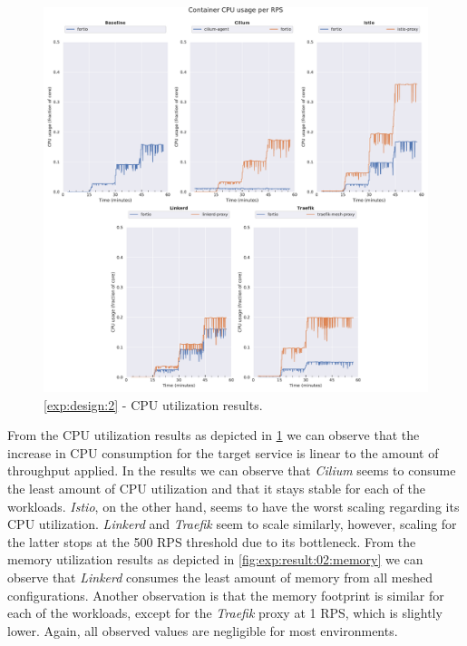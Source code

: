 \begin{figure}[h]
    \centering
    
    \includegraphics[width=\linewidth]{5_experimental_evaluation/figures/exp_02-cpu-results.pdf}

    \caption{\ref{exp:design:2} - CPU utilization results.}
    
    \label{fig:exp:result:02:cpu}
\end{figure}


From the CPU utilization results as depicted in \cref{fig:exp:result:02:cpu} we can observe that the increase in CPU consumption for the target service is linear to the amount of throughput applied. In the results we can observe that \textit{Cilium} seems to consume the least amount of CPU utilization and that it stays stable for each of the workloads. \textit{Istio}, on the other hand, seems to have the worst scaling regarding its CPU utilization. \textit{Linkerd} and \textit{Traefik} seem to scale similarly, however, scaling for the latter stops at the 500 RPS threshold due to its bottleneck. From the memory utilization results as depicted in \cref{fig:exp:result:02:memory} we can observe that \textit{Linkerd} consumes the least amount of memory from all meshed configurations. Another observation is that the memory footprint is similar for each of the workloads, except for the \textit{Traefik} proxy at 1 RPS, which is slightly lower. Again, all observed values are negligible for most environments.



